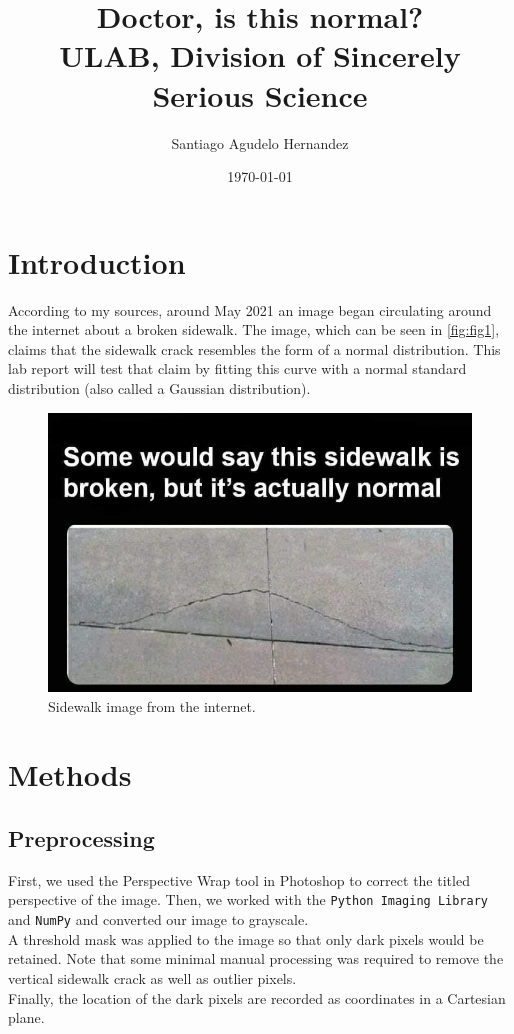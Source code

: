 \documentclass{article}
\title{Doctor, is this normal?
\\
\large{ULAB, Division of Sincerely Serious Science}
}
\author{Santiago Agudelo Hernandez}
\date{\today}
\begin{document}
\maketitle
\section{Introduction}

According to my sources, around May 2021 an image began circulating around the internet about a broken sidewalk. The image, which can be seen in \autoref{fig:fig1}, claims that the sidewalk crack resembles the form of a normal distribution. This lab report will test that claim by fitting this curve with a normal standard distribution (also called a Gaussian distribution).

\begin{figure}[h]
    \centering
    \includegraphics[width=0.8\linewidth]{img.jpg}
    \caption{Sidewalk image from the internet.}
    \label{fig:fig1}
\end{figure}

\section{Methods}

\subsection{Preprocessing}
First, we used the Perspective Wrap tool in Photoshop to correct the titled perspective of the image. Then, we worked with the \texttt{Python Imaging Library} and \texttt{NumPy} \cite{2020NumPy-Array} and converted our image to grayscale.
\\A threshold mask was applied to the image so that only dark pixels would be retained. Note that some minimal manual processing was required to remove the vertical sidewalk crack as well as outlier pixels.
\\Finally, the location of the dark pixels are recorded as coordinates in a Cartesian plane.
\end{document}
